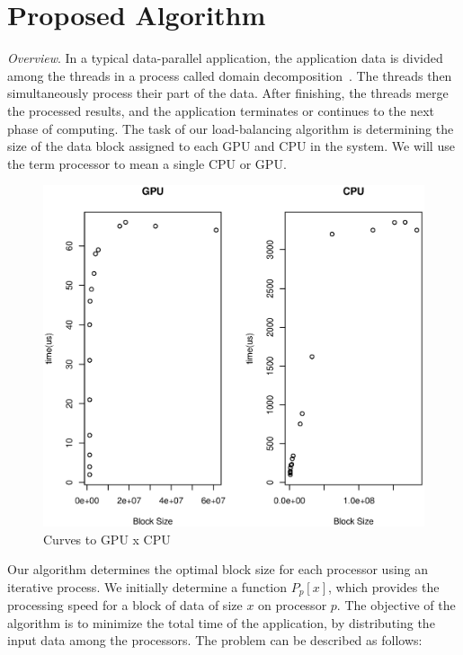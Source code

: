 \documentclass[journal]{IEEEtran}
\begin{document}
%


\section{Proposed Algorithm}

\textit{Overview}. In a typical data-parallel application, the application data
is divided among the threads in a process called domain
decomposition~\cite{Gropp:1992uq}. The threads then simultaneously process their
part of the data. After finishing, the threads merge the processed results, and
the application terminates or continues to the next phase of computing. The task
of our load-balancing algorithm is determining the size of the data block
assigned to each GPU and CPU in the system. We will use the term processor to
mean a single CPU or GPU.

\begin{figure}[htb]
	\begin{center}
	\centering
			\includegraphics[scale=0.3]{CPUVersusGPU.eps}
	\caption{Curves to GPU x CPU}
	\label{fig:CPUVersusGPU}
	\end{center}
\end{figure}


Our algorithm determines the optimal block size for each processor using an
iterative process. We initially determine a function $P_p[x]$, which provides
the processing speed for a block of data of size $x$ on processor $p$. The objective of the algorithm is to minimize the total time of the application, by distributing the input data among the processors. The problem can be described as follows:
\end{document}
